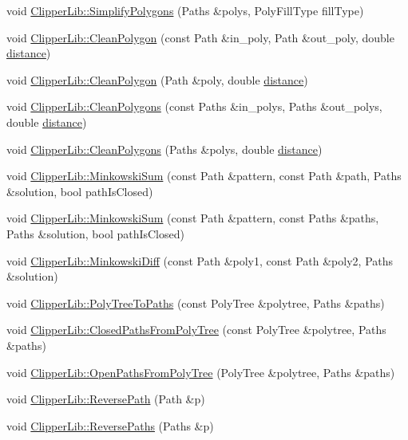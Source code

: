 \begin{DoxyCompactItemize}
void \mbox{\hyperlink{namespace_clipper_lib_ac43b677f95d30bd595bbdd5eb79cdcec}{Clipper\+Lib\+::\+Simplify\+Polygons}} (Paths \&polys, Poly\+Fill\+Type fill\+Type)
\item 
void \mbox{\hyperlink{namespace_clipper_lib_a9246a3146ac112581e82be58e158be7b}{Clipper\+Lib\+::\+Clean\+Polygon}} (const Path \&in\+\_\+poly, Path \&out\+\_\+poly, double \mbox{\hyperlink{unwrapping_8cc_ac6bcc6db62057bda0b6195a11578fdfa}{distance}})
\item 
void \mbox{\hyperlink{namespace_clipper_lib_a819f3ac34feed7ca8c64c54bc534eb1b}{Clipper\+Lib\+::\+Clean\+Polygon}} (Path \&poly, double \mbox{\hyperlink{unwrapping_8cc_ac6bcc6db62057bda0b6195a11578fdfa}{distance}})
\item 
void \mbox{\hyperlink{namespace_clipper_lib_a770cbc6ce4f16d02b8fe27c5abf6159c}{Clipper\+Lib\+::\+Clean\+Polygons}} (const Paths \&in\+\_\+polys, Paths \&out\+\_\+polys, double \mbox{\hyperlink{unwrapping_8cc_ac6bcc6db62057bda0b6195a11578fdfa}{distance}})
\item 
void \mbox{\hyperlink{namespace_clipper_lib_aeee397f9f7e7cb5f0bb4723b7c4969e9}{Clipper\+Lib\+::\+Clean\+Polygons}} (Paths \&polys, double \mbox{\hyperlink{unwrapping_8cc_ac6bcc6db62057bda0b6195a11578fdfa}{distance}})
\item 
void \mbox{\hyperlink{namespace_clipper_lib_ad12b5697c25579dce65d369a2e3cf608}{Clipper\+Lib\+::\+Minkowski\+Sum}} (const Path \&pattern, const Path \&path, Paths \&solution, bool path\+Is\+Closed)
\item 
void \mbox{\hyperlink{namespace_clipper_lib_ae4893aa579fd7c46ce695fd3d1c66e64}{Clipper\+Lib\+::\+Minkowski\+Sum}} (const Path \&pattern, const Paths \&paths, Paths \&solution, bool path\+Is\+Closed)
\item 
void \mbox{\hyperlink{namespace_clipper_lib_a76dac24102863220c7bc13be222a1dda}{Clipper\+Lib\+::\+Minkowski\+Diff}} (const Path \&poly1, const Path \&poly2, Paths \&solution)
\item 
void \mbox{\hyperlink{namespace_clipper_lib_a3713b024b773e4e041f3de4595ff0f77}{Clipper\+Lib\+::\+Poly\+Tree\+To\+Paths}} (const Poly\+Tree \&polytree, Paths \&paths)
\item 
void \mbox{\hyperlink{namespace_clipper_lib_a83f3a341799f94dd6bd9649b319d85fa}{Clipper\+Lib\+::\+Closed\+Paths\+From\+Poly\+Tree}} (const Poly\+Tree \&polytree, Paths \&paths)
\item 
void \mbox{\hyperlink{namespace_clipper_lib_aa8b0b36c4c1e8108f39b10e4fba81cc5}{Clipper\+Lib\+::\+Open\+Paths\+From\+Poly\+Tree}} (Poly\+Tree \&polytree, Paths \&paths)
\item 
void \mbox{\hyperlink{namespace_clipper_lib_ab6376320953c60093dc73462c74589e1}{Clipper\+Lib\+::\+Reverse\+Path}} (Path \&p)
\item 
void \mbox{\hyperlink{namespace_clipper_lib_ade103cad7caf2aa357b2d5410866ea62}{Clipper\+Lib\+::\+Reverse\+Paths}} (Paths \&p)
\end{DoxyCompactItemize}
